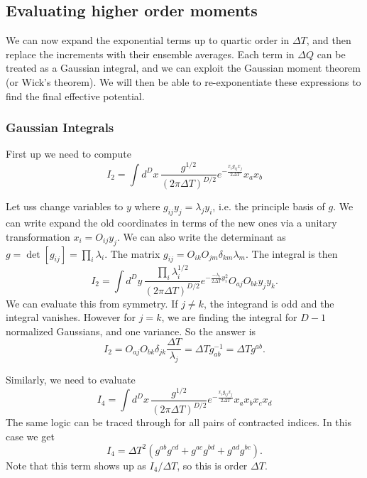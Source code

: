 \subsection{Evaluating higher order moments}

We can now expand the exponential terms up to quartic order in $\Delta T$,
and then replace the increments with their ensemble averages.  
Each term in $\Delta Q$ can be treated as a Gaussian integral, 
and we can exploit the Gaussian moment theorem (or Wick's theorem).  
We will then be able to re-exponentiate these expressions to find 
the final effective potential. 

\subsubsection{Gaussian Integrals}

First up we need to compute 
\begin{equation}
I_2 = \int d^Dx\,\frac{g^{1/2}}{(2\pi\Delta T)^{D/2}}  e^{-\frac{x_ig_{ij}x_j}{2\Delta T}}x_a x_b
\end{equation}

Let uss change variables to $y$ where $g_{ij}y_j = \lambda_jy_i$, i.e. the principle basis of $g$.
We can write expand the old coordinates in terms of the new ones via a unitary transformation $x_i = O_{ij}y_j$.
We can also write the determinant as $g = \det[g_{ij}] = \prod_i \lambda_i$.
The matrix $g_{ij} = O_{ik}O_{jm}\delta_{km}\lambda_m.$  
The integral is then
\begin{equation}
I_2 = \int d^Dy\,\frac{\prod_i \lambda_i^{1/2}}{(2\pi\Delta T)^{D/2}} 
 e^{-\frac{-\lambda_i}{2\Delta T} y_i^2} O_{aj}O_{bk}y_jy_k.
\end{equation}
We can evaluate this from symmetry.
If $j\ne k$, the integrand is odd and the integral vanishes.
However for $j=k$, we are finding the integral for $D-1$ normalized Gaussians,
 and one variance.
So the answer is 
\begin{equation}
\boxed{  I_2 = O_{aj}O_{bk}\delta_{jk}\frac{\Delta T}{\lambda_j}
 = \Delta Tg^{-1}_{ab} = \Delta T g^{ab}.}
\end{equation}

Similarly, we need to evaluate 
\begin{equation}
I_4 = \int d^Dx\,\frac{g^{1/2}}{(2\pi\Delta T)^{D/2}}
  e^{-\frac{x_ig_{ij}x_j}{2\Delta T}}x_a x_b x_c x_d
\end{equation}
The same logic can be traced through for all pairs of contracted indices.    
In this case we get 
\begin{equation}
\boxed{I_4 = \Delta T^2(g^{ab}g^{cd} + g^{ac}g^{bd} + g^{ad}g^{bc}).}
\end{equation}
Note that this term shows up as $I_4/\Delta T$, so this is order $\Delta T$.  

